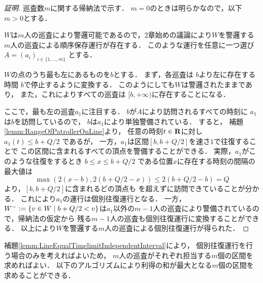 \begin{proof}[証明]

  \newcommand{\leftmostpoint}{b}  %
  \newcommand{\newpatroller}{l}
  \newcommand{\leftmostpatroller}{a_1}

  巡査数$m$に関する帰納法で示す．
  $m = 0$のときは明らかなので，以下$m > 0$とする．

  $W$は$m$人の巡査により警邏可能であるので，2章始めの議論により$W$を警邏する$m$人の巡査による順序保存運行が存在する．
  このような運行を任意に一つ選び
  $A = (a _i) _{i \in \{1, \ldots, m\}}$
  とする．

  $W$の点のうち最も左にあるものを$\leftmostpoint$とする．
  まず，各巡査は
  $\leftmostpoint$より左に存在する時間
  $\leftmostpoint$で停止するように変換する．
  このようにしても$W$は警邏されたままであり，
  また，これによりすべての巡査は
  $[\leftmostpoint, +\infty)$に存在することになる．

  ここで，最も左の巡査$\leftmostpatroller$に注目する．
  $\leftmostpoint$が$A$により訪問されるすべての時刻に
  $\leftmostpatroller$は$\leftmostpoint$を訪問しているので，
  $\leftmostpoint$は$\leftmostpatroller$により単独警備されている．
  すると，
  補題\ref{lemm:RangeOfPatrollerOnLine}より，
  任意の時刻$t \in \mathbf R$に対し
  $\leftmostpatroller(t) \leq \leftmostpoint + Q/2$
  であるが，
  一方，$\leftmostpatroller$は区間$[b, b + Q/2]$を速さ$1$で往復することで
  この区間に含まれるすべての頂点を警備することができる．
  実際，$\leftmostpatroller$がこのような往復をするとき
  $\leftmostpoint \leq x \leq \leftmostpoint + Q/2$
  である位置$x$に存在する時刻の間隔の最大値は
  \[
    \max( 2(x - \leftmostpoint), 2(\leftmostpoint + Q/2 - x) )
    \leq 2(\leftmostpoint + Q/2 - \leftmostpoint) = Q
  \]
  より，$[\leftmostpoint, \leftmostpoint + Q/2]$に含まれるどの頂点も
  {\idletime}を超えずに訪問できていることが分かる．
  これにより$\leftmostpatroller$の運行は個別往復運行となる．
  一方，$W^- := \mathsetmid{ v \in W }{ \leftmostpoint + Q/2 < v }$は$\leftmostpatroller$以外の$m - 1$人の巡査により警備されているので，帰納法の仮定から
  残る$m - 1$人の巡査も個別往復運行に変換することができる．
  以上により$W$を警邏する$m$人の巡査による個別往復運行が得られた．
\end{proof}


補題\ref{lemm:LineEqualTimelimitIndependentInterval}により，
個別往復運行を行う場合のみを考えればよいため，
$m$人の巡査がそれぞれ担当する$m$個の区間を求めればよい．
以下のアルゴリズムにより利得の和が最大となる$m$個の区間を求めることができる．

